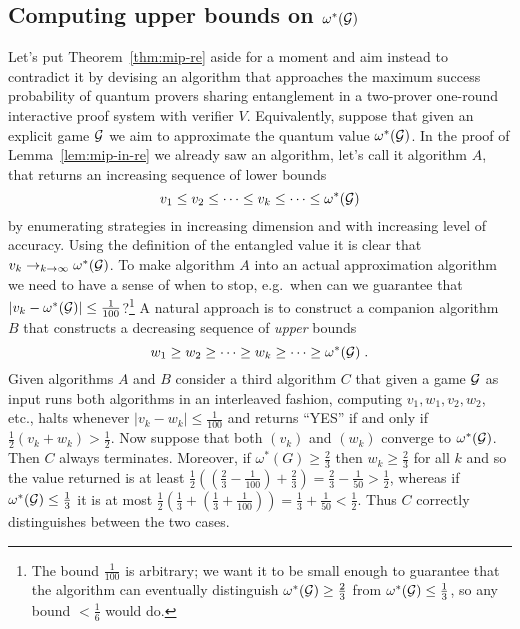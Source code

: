 \subsection{Computing upper bounds on $\omega^*(\mathcal{G})$}
\label{sec:ub-game}

Let's put Theorem~\ref{thm:mip-re} aside for a moment and aim instead to contradict it by devising an algorithm that approaches the maximum success probability of quantum provers sharing entanglement in a two-prover one-round interactive proof system with verifier $V$. Equivalently, suppose that given an explicit game $\mathcal{G}$ we aim to approximate the quantum value $\omega^*(\mathcal{G})$. In the proof of Lemma~\ref{lem:mip-in-re} we already saw an algorithm, let's call it algorithm $A$, that returns an increasing sequence of lower bounds 
\[ v_1 \leq v_2 \leq \cdots \leq v_k \leq \cdots \leq \omega^*(\mathcal{G})\]
by enumerating strategies in increasing dimension and with increasing level of accuracy. Using the definition of the entangled value it is clear that $v_k \to_{k\to\infty} \omega^*(\mathcal{G})$. To make algorithm $A$ into an actual approximation algorithm we need to have a sense of when to stop, e.g.\ when can we guarantee that $|v_k -\omega^*(\mathcal{G})|\leq \frac{1}{100}$?\footnote{The bound $\frac{1}{100}$ is arbitrary; we want it to be small enough to guarantee that the algorithm can eventually distinguish $\omega^*(\mathcal{G})\geq\frac{2}{3}$ from $\omega^*(\mathcal{G}) \leq\frac{1}{3}$, so any bound $<\frac{1}{6}$ would do.} A natural approach is to construct a companion algorithm $B$ that constructs a decreasing sequence of \emph{upper} bounds 
\[ w_1 \geq w_2 \geq \cdots \geq w_k \geq \cdots \geq \omega^*(\mathcal{G})\;.\]
Given algorithms $A$ and $B$ consider a third algorithm $C$ that given a game $\mathcal{G}$ as input runs both algorithms in an interleaved fashion, computing $v_1,w_1,v_2,w_2$, etc., halts whenever $|v_k-w_k|\leq \frac{1}{100}$ and returns ``YES'' if and only if $\frac{1}{2}(v_k+w_k) > \frac{1}{2}$. Now suppose that both $(v_k)$ and $(w_k)$ converge to $\omega^*(\mathcal{G})$. Then $C$ always terminates. Moreover, if $\omega^*(G) \geq \frac{2}{3}$ then $w_k \geq \frac{2}{3}$ for all $k$ and so the value returned is at least $\frac{1}{2}((\frac{2}{3}-\frac{1}{100})+\frac{2}{3})=\frac{2}{3}-\frac{1}{50} > \frac{1}{2}$, whereas if $\omega^*(\mathcal{G}) \leq \frac{1}{3}$ it is at most $\frac{1}{2}(\frac{1}{3}+(\frac{1}{3}+\frac{1}{100}))=\frac{1}{3}+\frac{1}{50} < \frac{1}{2}$. Thus $C$ correctly distinguishes between the two cases. 

